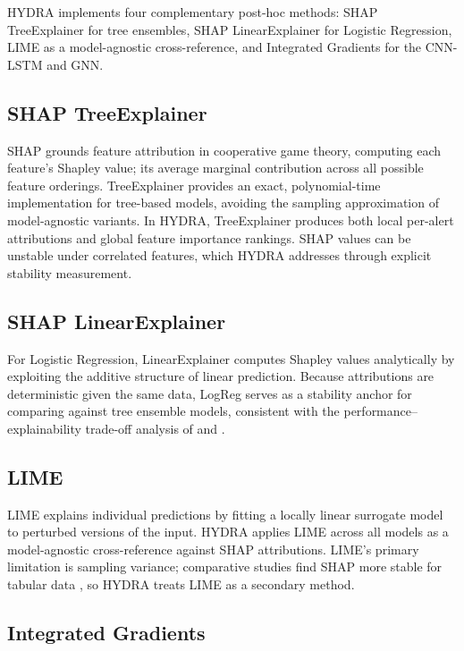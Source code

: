 \documentclass[12pt,a4paper]{report}
\begin{document}
HYDRA implements four complementary post-hoc methods: SHAP TreeExplainer for tree ensembles, SHAP LinearExplainer for Logistic Regression, LIME as a model-agnostic cross-reference, and Integrated Gradients for the CNN-LSTM and GNN.

\subsection{SHAP TreeExplainer}
\label{sec:shap-tree}

SHAP \cite{lundberg2017} grounds feature attribution in cooperative game theory, computing each feature's Shapley value; its average marginal contribution across all possible feature orderings. TreeExplainer \cite{lundberg2020} provides an exact, polynomial-time implementation for tree-based models, avoiding the sampling approximation of model-agnostic variants. In HYDRA, TreeExplainer produces both local per-alert attributions and global feature importance rankings. SHAP values can be unstable under correlated features, which HYDRA addresses through explicit stability measurement.

\subsection{SHAP LinearExplainer}
\label{sec:shap-linear}

For Logistic Regression, LinearExplainer computes Shapley values analytically by exploiting the additive structure of linear prediction. Because attributions are deterministic given the same data, LogReg serves as a stability anchor for comparing against tree ensemble models, consistent with the performance--explainability trade-off analysis of \cite{bhatt2020} and \cite{adadi2018}.

\subsection{LIME}
\label{sec:lime}

LIME \cite{ribeiro2016} explains individual predictions by fitting a locally linear surrogate model to perturbed versions of the input. HYDRA applies LIME across all models as a model-agnostic cross-reference against SHAP attributions. LIME's primary limitation is sampling variance; comparative studies find SHAP more stable for tabular data \cite{kalakoti2025}, so HYDRA treats LIME as a secondary method.

\subsection{Integrated Gradients}
\label{sec:ig}
\end{document}
